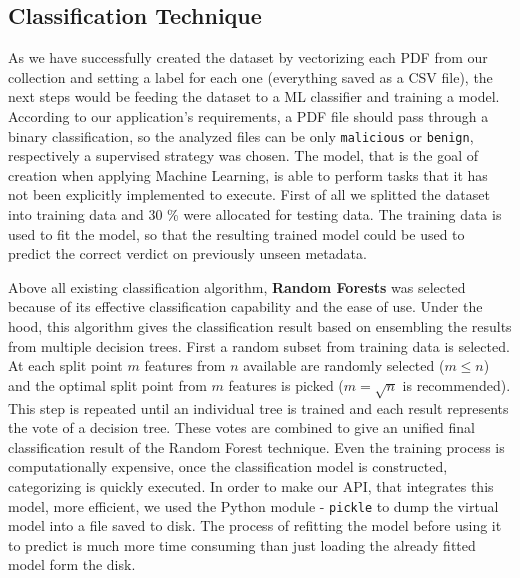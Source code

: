 \subsection{Classification Technique}
As we have successfully created the dataset by vectorizing each PDF from our collection and setting a label for each one (everything saved as a CSV file), the next steps would be feeding the dataset to a ML classifier and training a model. According to our application's requirements, a PDF file should pass through a binary classification, so the analyzed files can be only \texttt{malicious} or \texttt{benign}, respectively a supervised strategy was chosen. The model, that is the goal of creation when applying Machine Learning, is able to perform tasks that it has not been explicitly implemented to execute. First of all we splitted the dataset into training data and 30 \% were allocated for testing data. The training data is used to fit the model, so that the resulting trained model could be used to predict the correct verdict on previously unseen metadata. \par 
Above all existing classification algorithm, \textbf{Random Forests} was selected because of its effective classification capability and the ease of use. Under the hood, this algorithm gives the classification result based on ensembling the results from multiple decision trees. First a random subset from training data is selected. At each split point $m$ features from $n$ available are randomly selected ($m \leqslant n$) and the optimal split point from $m$ features is picked ($m = \sqrt{n}$ is recommended). This step is repeated until an individual tree is trained and each result represents the vote of a decision tree. These votes are combined to give an unified final classification result of the Random Forest technique.
Even the training process is computationally expensive, once the classification model is constructed, categorizing is quickly executed. In order to make our API, that integrates this model, more efficient, we used the Python module - \texttt{pickle} to dump the virtual model into a file saved to disk. The process of refitting the model before using it to predict is much more time consuming than just loading the already fitted model form the disk.


